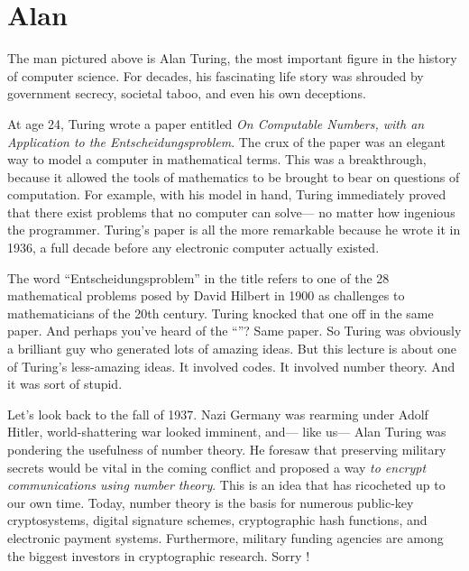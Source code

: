 \begin{problems}
\classproblems
{}
\end{problems}

\section{Alan }\label{Turing_sec}


The man pictured above is Alan Turing, the most important figure in
the history of computer science.  For decades, his fascinating life
story was shrouded by government secrecy, societal taboo, and even his
own deceptions.

At age 24, Turing wrote a paper entitled \emph{On Computable Numbers,
with an Application to the Entscheidungsproblem}.  The crux of the
paper was an elegant way to model a computer in mathematical terms.
This was a breakthrough, because it allowed the tools of mathematics
to be brought to bear on questions of computation.  For example, with
his model in hand, Turing immediately proved that there exist problems
that no computer can solve--- no matter how ingenious the programmer.
Turing's paper is all the more remarkable because he wrote it in 1936,
a full decade before any electronic computer actually existed.

The word ``Entscheidungsproblem'' in the title refers to one of the 28
mathematical problems posed by David Hilbert in 1900 as challenges to
mathematicians of the 20th century.  Turing knocked that one off in the
same paper.  And perhaps you've heard of the ``''?  Same paper.  So Turing was obviously a brilliant guy who
generated lots of amazing ideas.  But this lecture is about one of
Turing's less-amazing ideas.  It involved codes.  It involved number
theory.  And it was sort of stupid.


Let's look back to the fall of 1937.  Nazi Germany was rearming under
Adolf Hitler, world-shattering war looked imminent, and--- like us---
Alan Turing was pondering the usefulness of number theory.  He foresaw
that preserving military secrets would be vital in the coming conflict
and proposed a way \emph{to encrypt communications using number
theory}.  This is an idea that has ricocheted up to our own time.
Today, number theory is the basis for numerous public-key
cryptosystems, digital signature schemes, cryptographic hash
functions, and electronic payment systems.  Furthermore, military
funding agencies are among the biggest investors in cryptographic
research.  Sorry !

